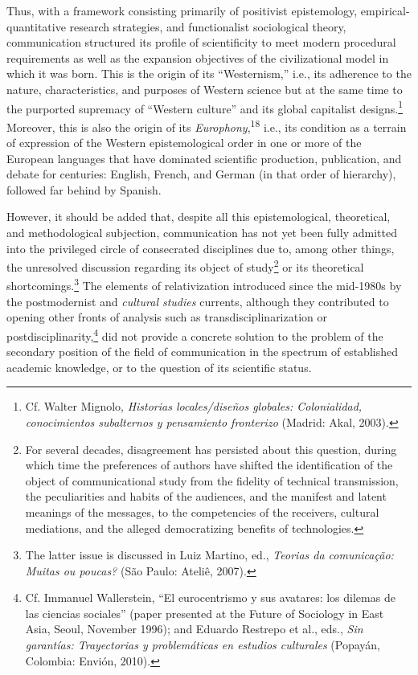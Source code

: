 \documentclass{tufte-handout}
\begin{document}
Thus, with a framework consisting primarily of positivist epistemology,
empirical-quantitative research strategies, and functionalist
sociological theory, communication structured its profile of
scientificity to meet modern procedural requirements as well as the
expansion objectives of the civilizational model in which it was born.
This is the origin of its ``Westernism,'' i.e., its adherence to the
nature, characteristics, and purposes of Western science but at the same
time to the purported supremacy of ``Western culture'' and its global
capitalist designs.\footnote{Cf. Walter Mignolo, \emph{Historias
  locales/diseños globales: Colonialidad, conocimientos subalternos y
  pensamiento fronterizo} (Madrid: Akal, 2003).} Moreover, this is also
the origin of its \emph{Europhony},\textsuperscript{18}
i.e., its condition as a terrain of expression of the Western
epistemological order in one or more of the European languages that have
dominated scientific production, publication, and debate for centuries:
English, French, and German (in that order of hierarchy), followed far
behind by Spanish.

However, it should be added that, despite all this epistemological,
theoretical, and methodological subjection, communication has not yet
been fully admitted into the privileged circle of consecrated
disciplines due to, among other things, the unresolved discussion
regarding its object of study\footnote{For several decades, disagreement
  has persisted about this question, during which time the preferences
  of authors have shifted the identification of the object of
  communicational study from the fidelity of technical transmission, the
  peculiarities and habits of the audiences, and the manifest and latent
  meanings of the messages, to the competencies of the receivers,
  cultural mediations, and the alleged democratizing benefits of
  technologies.} or its theoretical shortcomings.\footnote{The latter
  issue is discussed in Luiz Martino, ed., \emph{Teorias da comunicação:
  Muitas ou poucas?} (São Paulo: Ateliê, 2007).} The elements of
relativization introduced since the mid-1980s by the postmodernist and
\emph{cultural studies} currents, although they contributed to opening
other fronts of analysis such as transdisciplinarization or
postdisciplinarity,\footnote{Cf. Immanuel Wallerstein, ``El
  eurocentrismo y sus avatares: los dilemas de las ciencias sociales''
  (paper presented at the Future of Sociology in East Asia, Seoul,
  November 1996); and Eduardo Restrepo et al., eds., \emph{Sin
  garantías: Trayectorias y problemáticas en estudios culturales}
  (Popayán, Colombia: Envión, 2010).} did not provide a concrete
solution to the problem of the secondary position of the field of
communication in the spectrum of established academic knowledge, or to
the question of its scientific status.
\end{document}
